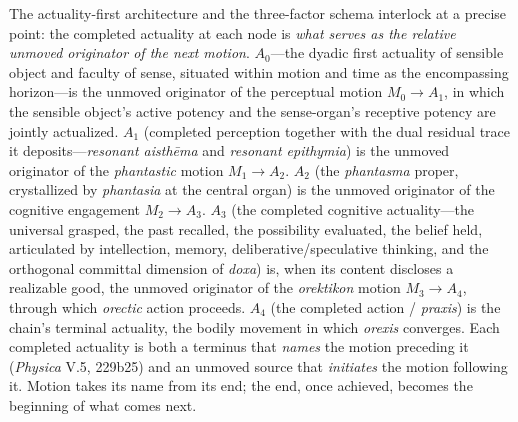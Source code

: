\documentclass{article}
\begin{document}
The actuality-first architecture and the three-factor schema interlock at a precise point: the completed actuality at each node is \textit{what serves as the relative unmoved originator of the next motion}. $A_0$---the dyadic first actuality of sensible object and faculty of sense, situated within motion and time as the encompassing horizon---is the unmoved originator of the perceptual motion $M_0 \rightarrow A_1$, in which the sensible object's active potency and the sense-organ's receptive potency are jointly actualized. $A_1$ (completed perception together with the dual residual trace it deposits---\textit{resonant aisthēma} and \textit{resonant epithymia}) is the unmoved originator of the \textit{phantastic} motion $M_1 \rightarrow A_2$. $A_2$ (the \textit{phantasma} proper, crystallized by \textit{phantasia} at the central organ) is the unmoved originator of the cognitive engagement $M_2 \rightarrow A_3$. $A_3$ (the completed cognitive actuality---the universal grasped, the past recalled, the possibility evaluated, the belief held, articulated by intellection, memory, deliberative/speculative thinking, and the orthogonal committal dimension of \textit{doxa}) is, when its content discloses a realizable good, the unmoved originator of the \textit{orektikon} motion $M_3 \rightarrow A_4$, through which \textit{orectic} action proceeds. $A_4$ (the completed action / \textit{praxis}) is the chain's terminal actuality, the bodily movement in which \textit{orexis} converges. Each completed actuality is both a terminus that \textit{names} the motion preceding it (\textit{Physica} V.5, 229b25) and an unmoved source that \textit{initiates} the motion following it. Motion takes its name from its end; the end, once achieved, becomes the beginning of what comes next. 
\end{document}
